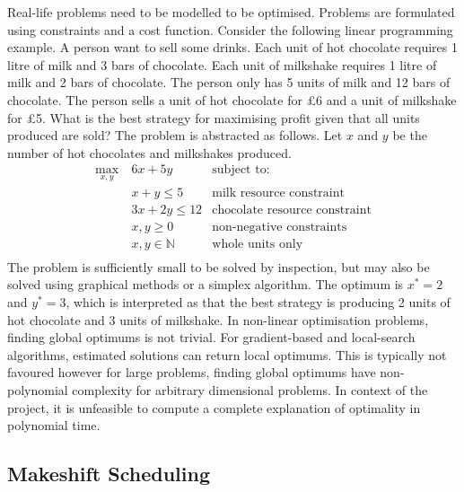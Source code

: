 Real-life problems need to be modelled to be optimised. Problems are formulated using constraints and a cost function. Consider the following linear programming example. A person want to sell some drinks. Each unit of hot chocolate requires 1 litre of milk and 3 bars of chocolate. Each unit of milkshake requires 1 litre of milk and 2 bars of chocolate. The person only has 5 units of milk and 12 bars of chocolate. The person sells a unit of hot chocolate for £6 and a unit of milkshake for £5. What is the best strategy for maximising profit given that all units produced are sold? The problem is abstracted as follows. Let $x$ and $y$ be the number of hot chocolates and milkshakes produced.
\begin{align*}
	\max_{x,y}\ &6x+5y&\text{subject to:}\\
	&x+y\leq 5&\text{milk resource constraint}\\
	&3x+2y\leq 12&\text{chocolate resource constraint}\\
	&x,y\geq 0&\text{non-negative constraints}\\
	&x,y\in\mathbb{N}&\text{whole units only}\\
\end{align*}
The problem is sufficiently small to be solved by inspection, but may also be solved using graphical methods or a simplex algorithm. The optimum is $x^*=2$ and $y^*=3$, which is interpreted as that the best strategy is producing 2 units of hot chocolate and 3 units of milkshake.
\linespace
In non-linear optimisation problems, finding global optimums is not trivial. For gradient-based and local-search algorithms, estimated solutions can return local optimums. This is typically not favoured however for large problems, finding global optimums have non-polynomial complexity for arbitrary dimensional problems. In context of the project, it is unfeasible to compute a complete explanation of optimality in polynomial time.

\subsection{Makeshift Scheduling}

